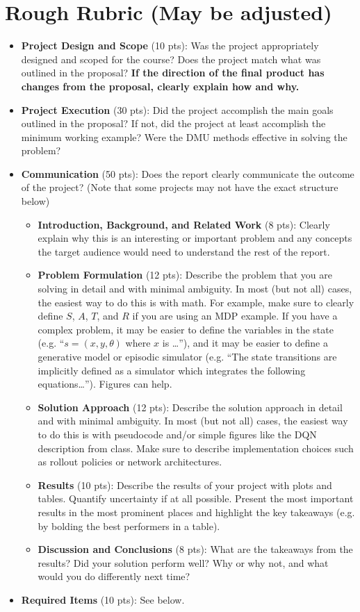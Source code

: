 \documentclass{article}
\begin{document}
\section*{Rough Rubric (May be adjusted)}

\begin{itemize}
    \item \textbf{Project Design and Scope} (10 pts): Was the project appropriately designed and scoped for the course? Does the project match what was outlined in the proposal? \textbf{\color{purple}If the direction of the final product has changes from the proposal, clearly explain how and why.}
    \item \textbf{Project Execution} (30 pts): Did the project accomplish the main goals outlined in the proposal? If not, did the project at least accomplish the minimum working example? Were the DMU methods effective in solving the problem?
    \item \textbf{Communication} (50 pts): Does the report clearly communicate the outcome of the project? (Note that some projects may not have the exact structure below)
        \begin{itemize}
            \item \textbf{Introduction, Background, and Related Work} (8 pts): Clearly explain why this is an interesting or important problem and any concepts the target audience would need to understand the rest of the report.
            \item \textbf{Problem Formulation} (12 pts): Describe the problem that you are solving in detail and with minimal ambiguity. In most (but not all) cases, the easiest way to do this is with math. For example, make sure to clearly define $S$, $A$, $T$, and $R$ if you are using an MDP example. If you have a complex problem, it may be easier to define the variables in the state (e.g. ``$s = (x,y,\theta)$ where $x$ is \ldots''), and it may be easier to define a generative model or episodic simulator (e.g. ``The state transitions are implicitly defined as a simulator which integrates the following equations\ldots''). Figures can help.
            \item \textbf{Solution Approach} (12 pts): Describe the solution approach in detail and with minimal ambiguity. In most (but not all) cases, the easiest way to do this is with pseudocode and/or simple figures like the DQN description from class. Make sure to describe implementation choices such as rollout policies or network architectures.
            \item \textbf{Results} (10 pts): Describe the results of your project with plots and tables. Quantify uncertainty if at all possible. Present the most important results in the most prominent places and highlight the key takeaways (e.g. by bolding the best performers in a table).
            \item \textbf{Discussion and Conclusions} (8 pts): What are the takeaways from the results? Did your solution perform well? Why or why not, and what would you do differently next time?
        \end{itemize}
    \item \textbf{Required Items} (10 pts): See below.
\end{itemize}
\end{document}
